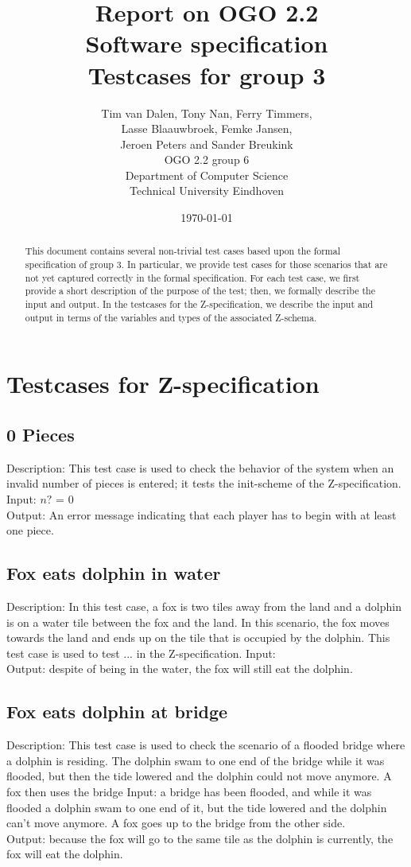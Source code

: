 \documentclass[a4paper,11pt]{article}
\title{Report on OGO 2.2 \\ Software specification\\ Testcases for group 3}
\author{
        Tim van Dalen, Tony Nan, Ferry Timmers, \\ Lasse Blaauwbroek, Femke Jansen, \\Jeroen Peters and Sander Breukink\\ OGO 2.2 group 6 \\
                Department of Computer Science\\
        Technical University Eindhoven\\
}
\date{\today}
\begin{document}
\maketitle

\begin{abstract}
This document contains several non-trivial test cases based upon the formal specification of group 3. In particular, we provide test cases for those scenarios that are not yet captured correctly in the formal specification. For each test case, we first provide a short description of the purpose of the test; then, we formally describe the input and output. In the testcases for the Z-specification, we describe the input and output in terms of the variables and types of the associated Z-schema.
\end{abstract}
	
    \section{Testcases for Z-specification}

	\subsection{0 Pieces}
    Description: This test case is used to check the behavior of the system when an invalid number of pieces is entered; it tests the init-scheme of the Z-specification. \\
    Input: $n?$ = 0 \\
    Output: An error message indicating that each player has to begin with at least one piece.

	\subsection{Fox eats dolphin in water}
    Description: In this test case, a fox is two tiles away from the land and a dolphin is on a water tile between the fox and the land. In this scenario, the fox moves towards the land and ends up on the tile that is occupied by the dolphin. This test case is used to test ... in the Z-specification.
    Input:  \\
    Output: despite of being in the water, the fox will still eat the dolphin.\\

    \subsection{Fox eats dolphin at bridge}
    Description: This test case is used to check the scenario of a flooded bridge where a dolphin is residing. The dolphin swam to one end of the bridge while it was flooded, but then the tide lowered and the dolphin could not move anymore. A fox then uses the bridge 
    Input: a bridge has been flooded, and while it was flooded a dolphin swam to one end of it, but the tide lowered and the dolphin can't move anymore. A fox goes up to the bridge from the other side.\\
    Output: because the fox will go to the same tile as the dolphin is currently, the fox will eat the dolphin.\\
\end{document}
